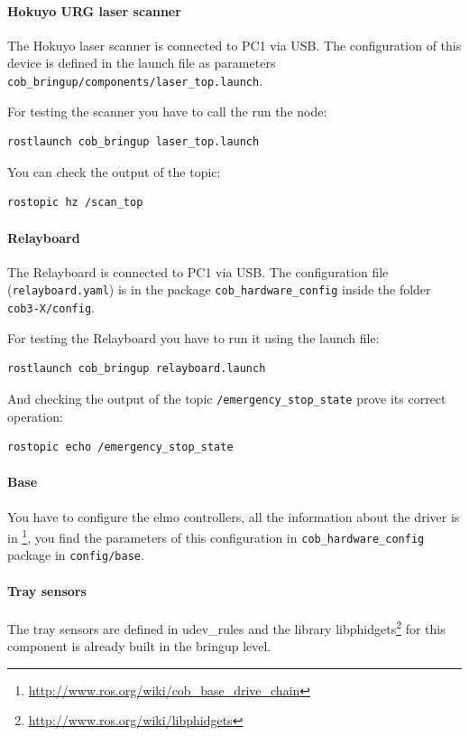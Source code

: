 \paragraph{Hokuyo URG laser scanner}
The Hokuyo laser scanner is connected to PC1 via USB. The configuration of this device is defined in the launch file as parameters \texttt{cob\_bringup/components/laser\_top.launch}.

For testing the scanner you have to call the run the node:
\begin{lstlisting}
rostlaunch cob_bringup laser_top.launch
\end{lstlisting}

You can check the output of the topic:
\begin{lstlisting}
rostopic hz /scan_top
\end{lstlisting}

\paragraph{Relayboard}
The Relayboard is connected to PC1 via USB. The configuration file (\texttt{relayboard.yaml}) is in the package \texttt{cob\_hardware\_config} inside the folder \texttt{cob3-X/config}.

For testing the Relayboard you have to run it using the launch file:
\begin{lstlisting}
rostlaunch cob_bringup relayboard.launch
\end{lstlisting}

And checking the output of the topic \texttt{/emergency\_stop\_state} prove its correct operation:
\begin{lstlisting}
rostopic echo /emergency_stop_state
\end{lstlisting}

\paragraph{Base}
You have to configure the elmo controllers, all the information about the driver is in \footnote{\url{http://www.ros.org/wiki/cob_base_drive_chain}}, you find the parameters of this configuration in \texttt{cob\_hardware\_config} package in \texttt{config/base}.

\paragraph{Tray sensors}
The tray sensors are defined in udev\_rules and the library libphidgets\footnote{\url{http://www.ros.org/wiki/libphidgets}} for this component is already built in the bringup level.


